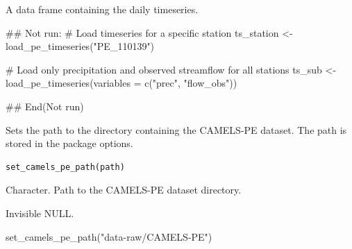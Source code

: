 \documentclass[a4paper]{book}
\begin{document}
%
\begin{Value}
A data frame containing the daily timeseries.
\end{Value}
%
\begin{Examples}
\begin{ExampleCode}
## Not run: 
# Load timeseries for a specific station
ts_station <- load_pe_timeseries("PE_110139")

# Load only precipitation and observed streamflow for all stations
ts_sub <- load_pe_timeseries(variables = c("prec", "flow_obs"))

## End(Not run)
\end{ExampleCode}
\end{Examples}
%
\begin{Description}
Sets the path to the directory containing the CAMELS-PE dataset.
The path is stored in the package options.
\end{Description}
%
\begin{Usage}
\begin{verbatim}
set_camels_pe_path(path)
\end{verbatim}
\end{Usage}
%
\begin{Arguments}
\begin{ldescription}
\item[\code{path}] Character. Path to the CAMELS-PE dataset directory.
\end{ldescription}
\end{Arguments}
%
\begin{Value}
Invisible NULL.
\end{Value}
%
\begin{Examples}
\begin{ExampleCode}
set_camels_pe_path("data-raw/CAMELS-PE")
\end{ExampleCode}
\end{Examples}
\printindex{}
\end{document}
